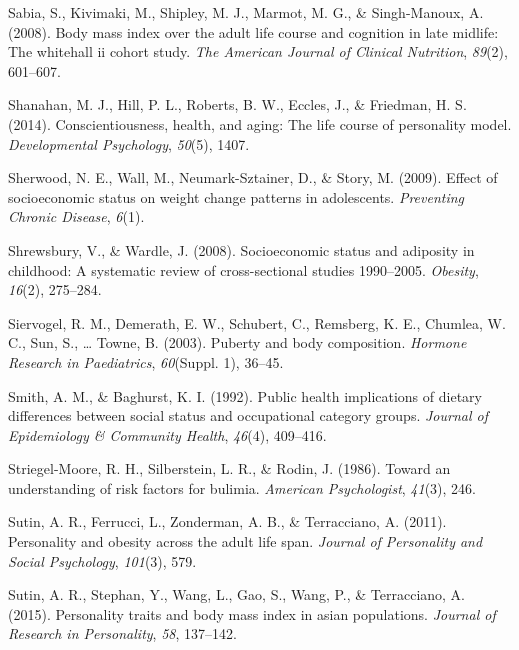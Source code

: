 \documentclass[man]{apa6}
\begin{document}
\leavevmode\hypertarget{ref-sabia2008body}{}%
Sabia, S., Kivimaki, M., Shipley, M. J., Marmot, M. G., \& Singh-Manoux, A. (2008). Body mass index over the adult life course and cognition in late midlife: The whitehall ii cohort study. \emph{The American Journal of Clinical Nutrition}, \emph{89}(2), 601--607.

\leavevmode\hypertarget{ref-shanahan2014conscientiousness}{}%
Shanahan, M. J., Hill, P. L., Roberts, B. W., Eccles, J., \& Friedman, H. S. (2014). Conscientiousness, health, and aging: The life course of personality model. \emph{Developmental Psychology}, \emph{50}(5), 1407.

\leavevmode\hypertarget{ref-neumarkeffect}{}%
Sherwood, N. E., Wall, M., Neumark-Sztainer, D., \& Story, M. (2009). Effect of socioeconomic status on weight change patterns in adolescents. \emph{Preventing Chronic Disease}, \emph{6}(1).

\leavevmode\hypertarget{ref-shrewsbury2008socioeconomic}{}%
Shrewsbury, V., \& Wardle, J. (2008). Socioeconomic status and adiposity in childhood: A systematic review of cross-sectional studies 1990--2005. \emph{Obesity}, \emph{16}(2), 275--284.

\leavevmode\hypertarget{ref-siervogel2003puberty}{}%
Siervogel, R. M., Demerath, E. W., Schubert, C., Remsberg, K. E., Chumlea, W. C., Sun, S., \ldots{} Towne, B. (2003). Puberty and body composition. \emph{Hormone Research in Paediatrics}, \emph{60}(Suppl. 1), 36--45.

\leavevmode\hypertarget{ref-smith1992public}{}%
Smith, A. M., \& Baghurst, K. I. (1992). Public health implications of dietary differences between social status and occupational category groups. \emph{Journal of Epidemiology \& Community Health}, \emph{46}(4), 409--416.

\leavevmode\hypertarget{ref-striegel1986toward}{}%
Striegel-Moore, R. H., Silberstein, L. R., \& Rodin, J. (1986). Toward an understanding of risk factors for bulimia. \emph{American Psychologist}, \emph{41}(3), 246.

\leavevmode\hypertarget{ref-sutin2011personality}{}%
Sutin, A. R., Ferrucci, L., Zonderman, A. B., \& Terracciano, A. (2011). Personality and obesity across the adult life span. \emph{Journal of Personality and Social Psychology}, \emph{101}(3), 579.

\leavevmode\hypertarget{ref-sutin2015personality}{}%
Sutin, A. R., Stephan, Y., Wang, L., Gao, S., Wang, P., \& Terracciano, A. (2015). Personality traits and body mass index in asian populations. \emph{Journal of Research in Personality}, \emph{58}, 137--142.
\end{document}
